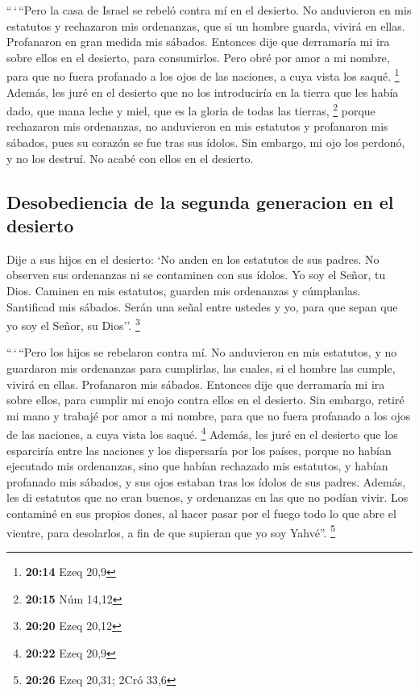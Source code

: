  ``\,`\,``Pero la casa de Israel se rebeló contra mí en
el desierto. No anduvieron en mis estatutos y rechazaron mis ordenanzas,
que si un hombre guarda, vivirá en ellas. Profanaron en gran medida mis
sábados. Entonces dije que derramaría mi ira sobre ellos en el desierto,
para consumirlos.  Pero obré por amor a mi nombre, para
que no fuera profanado a los ojos de las naciones, a cuya vista los
saqué. \footnote{\textbf{20:14} Ezeq 20,9}  Además, les
juré en el desierto que no los introduciría en la tierra que les había
dado, que mana leche y miel, que es la gloria de todas las tierras,
\footnote{\textbf{20:15} Núm 14,12}  porque rechazaron
mis ordenanzas, no anduvieron en mis estatutos y profanaron mis sábados,
pues su corazón se fue tras sus ídolos.  Sin embargo, mi
ojo los perdonó, y no los destruí. No acabé con ellos en el desierto.

\hypertarget{desobediencia-de-la-segunda-generacion-en-el-desierto}{%
\subsection{Desobediencia de la segunda generacion en el
desierto}\label{desobediencia-de-la-segunda-generacion-en-el-desierto}}

 Dije a sus hijos en el desierto: `No anden en los
estatutos de sus padres. No observen sus ordenanzas ni se contaminen con
sus ídolos.  Yo soy el Señor, tu Dios. Caminen en mis
estatutos, guarden mis ordenanzas y cúmplanlas. 
Santificad mis sábados. Serán una señal entre ustedes y yo, para que
sepan que yo soy el Señor, su Dios''. \footnote{\textbf{20:20} Ezeq
  20,12}

 ``\,`\,``Pero los hijos se rebelaron contra mí. No
anduvieron en mis estatutos, y no guardaron mis ordenanzas para
cumplirlas, las cuales, si el hombre las cumple, vivirá en ellas.
Profanaron mis sábados. Entonces dije que derramaría mi ira sobre ellos,
para cumplir mi enojo contra ellos en el desierto.  Sin
embargo, retiré mi mano y trabajé por amor a mi nombre, para que no
fuera profanado a los ojos de las naciones, a cuya vista los saqué.
\footnote{\textbf{20:22} Ezeq 20,9}  Además, les juré en
el desierto que los esparciría entre las naciones y los dispersaría por
los países,  porque no habían ejecutado mis ordenanzas,
sino que habían rechazado mis estatutos, y habían profanado mis sábados,
y sus ojos estaban tras los ídolos de sus padres. 
Además, les di estatutos que no eran buenos, y ordenanzas en las que no
podían vivir.  Los contaminé en sus propios dones, al
hacer pasar por el fuego todo lo que abre el vientre, para desolarlos, a
fin de que supieran que yo soy Yahvé''. \footnote{\textbf{20:26} Ezeq
  20,31; 2Cró 33,6}

